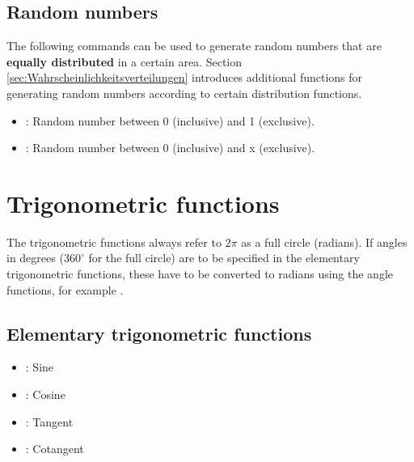


\section{Random numbers}

The following commands can be used to generate random numbers
that are \textbf{equally distributed} in a certain area.
Section \ref{sec:Wahrscheinlichkeitsverteilungen} introduces
additional functions for generating random numbers according
to certain distribution functions.

\begin{itemize}

\item
{}:
Random number between 0 (inclusive) and 1 (exclusive).

\item
{}:
Random number between 0 (inclusive) and x (exclusive).

\end{itemize}





\chapter{Trigonometric functions}\label{sec:Winkelfunktionen}

The trigonometric functions always refer to $2\pi$ as a full circle (radians).
If angles in degrees ($360^\circ$ for the full circle) are to be specified
in the elementary trigonometric functions,
these have to be converted to radians using the angle functions, for example
.



\section{Elementary trigonometric functions}

\begin{itemize}

\item
{}:
Sine

\item
{}:
Cosine

\item
{}:
Tangent

\item
{}:
Cotangent

\end{itemize}



